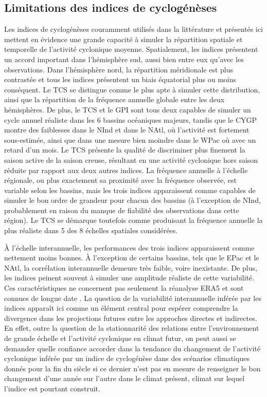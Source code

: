 \documentclass[../main.tex]{subfiles}
\begin{document}
\subsection{Limitations des indices de cyclogénèses}

Les indices de cyclogénèses couramment utilisés dans la littérature et présentés ici mettent en évidence une grande capacité à simuler la répartition spatiale et
temporelle de l'activité cyclonique moyenne. Spatialement, les indices présentent un accord important dans l'hémisphère sud, aussi bien entre eux qu'avec les
observations. Dans l'hémisphère nord, la répartition méridionale est plus contrastée et tous les indices présentent un biais équatorial plus ou moins
conséquent. Le TCS se distingue comme le plus apte à simuler cette distribution, ainsi que la répartition de la fréquence annuelle globale entre les deux
hémisphères. De plus, le TCS et le GPI sont tous deux capables de simuler un cycle annuel réaliste dans les 6 bassins océaniques majeurs, tandis que le CYGP
montre des faiblesses dans le NInd et dans le NAtl, où l'activité est fortement sous-estimée, ainsi que dans une mesure bien moindre dans le WPac où avec un
retard d'un mois. Le TCS présente la qualité de discriminer plus finement la saison active de la saison creuse, résultant en une activité cyclonique hors saison
réduite par rapport aux deux autres indices. La fréquence annuelle à l'échelle régionale, ou plus exactement sa proximité avec la fréquence observée, est
variable selon les bassins, mais les trois indices apparaissent comme capables de simuler le bon ordre de grandeur pour chacun des bassins (à l'exception de NInd,
probablement en raison du manque de fiabilité des observations dans cette région). Le TCS se démarque toutefois comme produisant la fréquence annuelle la plus
réaliste dans 5 des 8 échelles spatiales considérées.

À l'échelle interannuelle, les performances des trois indices apparaissent comme nettement moins bonnes. À l'exception de certains bassins, tels que le EPac et
le NAtl, la corrélation interannuelle demeure très faible, voire inexistante. De plus, les indices peinent souvent à simuler une amplitude réaliste de cette
variabilité. Ces caractéristiques ne concernent pas seulement la réanalyse ERA5 et sont connues de longue date
\parencite{watterson_seasonal_1995,camargo_tropical_2007,tippett_poisson_2011,menkes_comparison_2012,wang_dynamic_2020,cavicchia_tropical_2023a}. La question de
la variabilité interannuelle inférée par les indices apparaît ici comme un élément central pour espérer comprendre la divergence dans les projections futures
entre les approches directes et indirectes. En effet, outre la question de la stationnarité des relations entre l'environnement de grande échelle et l'activité
cyclonique en climat futur, on peut aussi se demander quelle confiance accorder dans la tendance du changement de l'activité cyclonique inférée par un indice de
cyclogénèse dans des scénarios climatiques donnés pour la fin du siècle si ce dernier n'est pas en mesure de renseigner le bon changement d'une année sur
l'autre dans le climat présent, climat sur lequel l'indice est pourtant construit.
\end{document}
